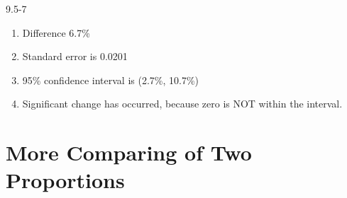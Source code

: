 \begin{exsol@solution}{9.5-7}

\begin{enumerate}
\item Difference 6.7\%

\item Standard error is 0.0201
\item  95\% confidence interval is (2.7\%, 10.7\%)

\item Significant change has occurred, because zero is NOT within the interval.

\end{enumerate}

\end{exsol@solution}
\setcounter{chapter}{9}\chapter{More Comparing of Two Proportions}
